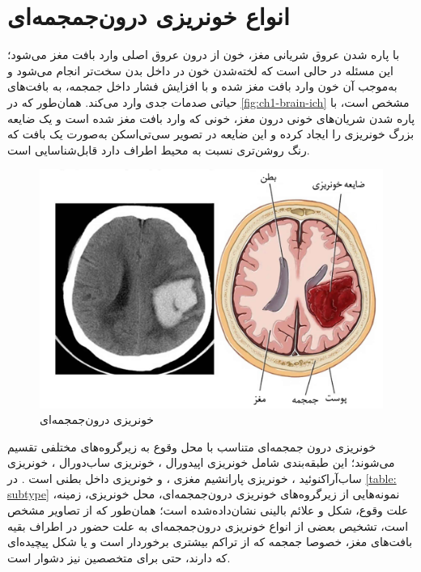 \section{انواع خونریزی درون‌جمجمه‌ای}
با پاره شدن عروق شریانی مغز، خون از درون عروق اصلی وارد بافت مغز می‌شود؛ این مسئله در حالی است که لخته‌شدن خون در داخل بدن سخت‌‌تر انجام می‌شود و به‌موجب آن خون وارد بافت مغز شده و با افزایش فشار داخل جمجمه، به بافت‌های حیاتی صدمات جدی وارد می‌کند.  
همان‌طور که در
  \autoref{fig:ch1-brain-ich}
  مشخص است، با پاره شدن شریان‌های خونی درون مغز، خونی که وارد بافت مغز شده است و یک ضایعه بزرگ خونریزی را ایجاد کرده و این ضایعه در تصویر سی‌تی‌اسکن به‌صورت یک بافت که رنگ روشن‌تری نسبت به محیط اطراف دارد قابل‌شناسایی است.
   ‎
\begin{figure}[H]
\centering
\includegraphics[width=1.0\linewidth]{"Images/Chapter1/brain - ich"}
\caption{خونریزی درون‌جمجمه‌ای
\cite{healthjade_intracerebral_hemorrhage}}
\label{fig:ch1-brain-ich}
\end{figure}
خونریزی درون جمجمه‌ای متناسب با محل وقوع به زیرگروه‌های مختلفی تقسیم می‌شوند؛
این طبقه‌بندی شامل خونریزی اپیدورال
 ، خونریزی ساب‌دورال
  ، خونریزی ساب‌آراکنوئید
   ، خونریزی پارانشیم مغزی 
   ، و خونریزی داخل بطنی
  است \cite{burduja2020accurate,hssayeni2020intracranial}.
  در
 \autoref{table: subtype}
 نمونه‌هایی از زیرگروه‌های خونریزی درون‌جمجمه‌ای، محل خونریزی، زمینه، علت وقوع، شکل و علائم بالینی نشان‌داده‌شده است؛ همان‌طور که از تصاویر مشخص است، تشخیص بعضی از انواع خونریزی ‌درون‌جمجمه‌ای به علت حضور در اطراف بقیه بافت‌های مغز،‌ خصوصا جمجمه که از تراکم بیشتری برخوردار است و یا شکل پیچیده‌ای که دارند، حتی برای متخصصین نیز دشوار است.
  
